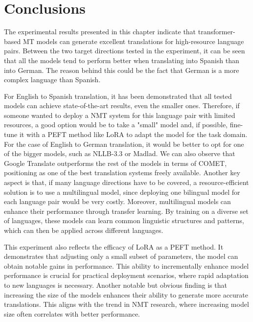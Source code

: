 \documentclass[11pt,english,listoffigures,listoftables]{tfgetsinf}
\begin{document}

\section{Conclusions}


The experimental results presented in this chapter indicate that transformer-based MT models can generate excellent translations for high-resource language pairs. Between the two target directions tested in the experiment, it can be seen that all the models tend to perform better when translating into Spanish than into German. The reason behind this could be the fact that German is a more complex language than Spanish.

For English to Spanish translation, it has been demonstrated that all tested models can achieve state-of-the-art results, even the smaller ones. Therefore, if someone wanted to deploy a NMT system for this language pair with limited resources, a good option would be to take a "small" model and, if possible, fine-tune it with a PEFT method like LoRA to adapt the model for the task domain. For the case of English to German translation, it would be better to opt for one of the bigger models, such as NLLB-3.3 or Madlad. We can also observe that Google Translate outperforms the rest of the models in terms of COMET, positioning as one of the best translation systems freely available. Another key aspect is that, if many language directions have to be covered, a resource-efficient solution is to use a multilingual model, since deploying one bilingual model for each language pair would be very costly. Moreover, multilingual models can enhance their performance through transfer learning. By training on a diverse set of languages, these models can learn common linguistic structures and patterns, which can then be applied across different languages.

This experiment also reflects the efficacy of LoRA as a PEFT method. It demonstrates that adjusting only a small subset of parameters, the model can obtain notable gains in performance. This ability to incrementally enhance model performance is crucial for practical deployment scenarios, where rapid adaptation to new languages is necessary. Another notable but obvious finding is that increasing the size of the models enhances their ability to generate more accurate translations. This aligns with the trend in NMT research, where increasing model size often correlates with better performance.
\end{document}

